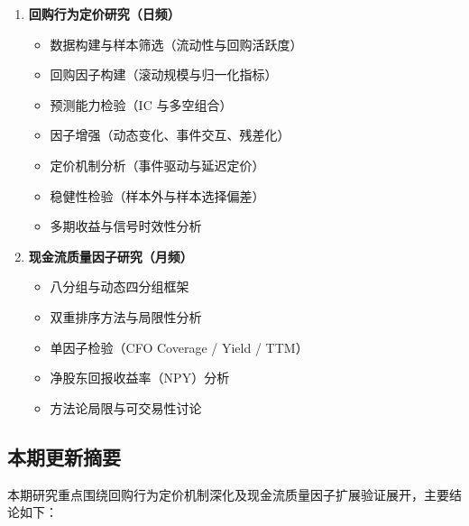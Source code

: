 \documentclass[a4paper,10pt]{article}
\begin{document}
\begin{enumerate}
    \item \textbf{回购行为定价研究（日频）}
    \begin{itemize}
        \item 数据构建与样本筛选（流动性与回购活跃度）
        \item 回购因子构建（滚动规模与归一化指标）
        \item 预测能力检验（IC 与多空组合）
        \item 因子增强（动态变化、事件交互、残差化）
        \item 定价机制分析（事件驱动与延迟定价）
        \item 稳健性检验（样本外与样本选择偏差）
        \item 多期收益与信号时效性分析
    \end{itemize}
    
    \item \textbf{现金流质量因子研究（月频）}
    \begin{itemize}
        \item 八分组与动态四分组框架
        \item 双重排序方法与局限性分析
        \item 单因子检验（CFO Coverage / Yield / TTM）
        \item 净股东回报收益率（NPY）分析
        \item 方法论局限与可交易性讨论
    \end{itemize}
\end{enumerate}

\subsection{本期更新摘要}

本期研究重点围绕回购行为定价机制深化及现金流质量因子扩展验证展开，主要结论如下：
\end{document}
